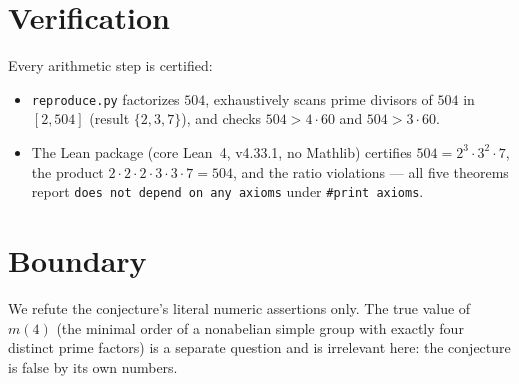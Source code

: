 \documentclass[11pt]{article}
\begin{document}
\section{Verification}

Every arithmetic step is certified:
\begin{itemize}
\item \texttt{reproduce.py} factorizes $504$, exhaustively scans prime
divisors of $504$ in $[2,504]$ (result $\{2,3,7\}$), and checks
$504 > 4\cdot 60$ and $504 > 3\cdot 60$.
\item The Lean package (core Lean~4, v4.33.1, no Mathlib) certifies
$504 = 2^3\cdot 3^2\cdot 7$, the product $2\cdot2\cdot2\cdot3\cdot3\cdot7 =
504$, and the ratio violations --- all five theorems report
\texttt{does not depend on any axioms} under \texttt{\#print axioms}.
\end{itemize}

\section{Boundary}

We refute the conjecture's literal numeric assertions only. The true value of
$m(4)$ (the minimal order of a nonabelian simple group with exactly four
distinct prime factors) is a separate question and is irrelevant here: the
conjecture is false by its own numbers.
\end{document}
